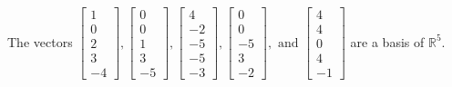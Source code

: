 \begin{exercise}
\begin{exerciseStatement}
  \end{exerciseStatement}
  \begin{exerciseAnswer}
   The vectors \(\left[\begin{array}{r}
1 \\
0 \\
2 \\
3 \\
-4
\end{array}\right] , \left[\begin{array}{r}
0 \\
0 \\
1 \\
3 \\
-5
\end{array}\right] , \left[\begin{array}{r}
4 \\
-2 \\
-5 \\
-5 \\
-3
\end{array}\right] , \left[\begin{array}{r}
0 \\
0 \\
-5 \\
3 \\
-2
\end{array}\right] , \text{ and } \left[\begin{array}{r}
4 \\
4 \\
0 \\
4 \\
-1
\end{array}\right]\) 
  	 are  a basis of \(\mathbb{R}^5\).
  


  \end{exerciseAnswer}
\end{exercise}